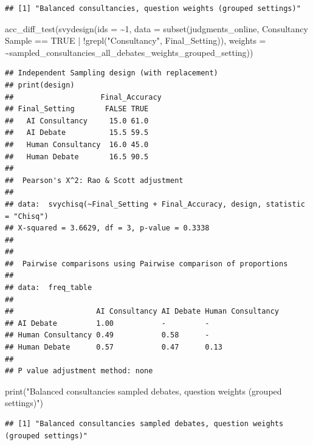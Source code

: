 \documentclass[
]{article}
\newenvironment{Shaded}{\begin{snugshade}}{\end{snugshade}}
\newcommand{\AttributeTok}[1]{\textcolor[rgb]{0.77,0.63,0.00}{#1}}
\newcommand{\ConstantTok}[1]{\textcolor[rgb]{0.00,0.00,0.00}{#1}}
\newcommand{\DecValTok}[1]{\textcolor[rgb]{0.00,0.00,0.81}{#1}}
\newcommand{\FunctionTok}[1]{\textcolor[rgb]{0.00,0.00,0.00}{#1}}
\newcommand{\NormalTok}[1]{#1}
\newcommand{\SpecialCharTok}[1]{\textcolor[rgb]{0.00,0.00,0.00}{#1}}
\newcommand{\StringTok}[1]{\textcolor[rgb]{0.31,0.60,0.02}{#1}}
\begin{document}
\begin{verbatim}
## [1] "Balanced consultancies, question weights (grouped settings)"
\end{verbatim}

\begin{Shaded}
\begin{Highlighting}[]
\FunctionTok{acc\_diff\_test}\NormalTok{(}\FunctionTok{svydesign}\NormalTok{(}\AttributeTok{ids =} \SpecialCharTok{\textasciitilde{}}\DecValTok{1}\NormalTok{, }\AttributeTok{data =} \FunctionTok{subset}\NormalTok{(judgments\_online, }\StringTok{\textasciigrave{}}\AttributeTok{Consultancy Sample}\StringTok{\textasciigrave{}} \SpecialCharTok{==} \ConstantTok{TRUE} \SpecialCharTok{|} \SpecialCharTok{!}\FunctionTok{grepl}\NormalTok{(}\StringTok{"Consultancy"}\NormalTok{, Final\_Setting)), }\AttributeTok{weights =} \SpecialCharTok{\textasciitilde{}}\NormalTok{sampled\_consultancies\_all\_debates\_weights\_grouped\_setting))}
\end{Highlighting}
\end{Shaded}

\begin{verbatim}
## Independent Sampling design (with replacement)
## print(design)
##                    Final_Accuracy
## Final_Setting       FALSE TRUE
##   AI Consultancy     15.0 61.0
##   AI Debate          15.5 59.5
##   Human Consultancy  16.0 45.0
##   Human Debate       16.5 90.5
## 
##  Pearson's X^2: Rao & Scott adjustment
## 
## data:  svychisq(~Final_Setting + Final_Accuracy, design, statistic = "Chisq")
## X-squared = 3.6629, df = 3, p-value = 0.3338
## 
## 
##  Pairwise comparisons using Pairwise comparison of proportions 
## 
## data:  freq_table 
## 
##                   AI Consultancy AI Debate Human Consultancy
## AI Debate         1.00           -         -                
## Human Consultancy 0.49           0.58      -                
## Human Debate      0.57           0.47      0.13             
## 
## P value adjustment method: none
\end{verbatim}

\begin{Shaded}
\begin{Highlighting}[]
\FunctionTok{print}\NormalTok{(}\StringTok{"Balanced consultancies sampled debates, question weights (grouped settings)"}\NormalTok{)}
\end{Highlighting}
\end{Shaded}

\begin{verbatim}
## [1] "Balanced consultancies sampled debates, question weights (grouped settings)"
\end{verbatim}
\end{document}
